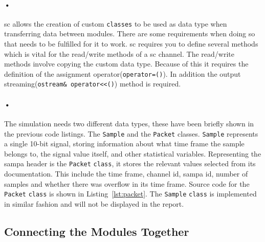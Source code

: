 \documentclass[a4paper, 12pt, openright, twoside]{report}
\newcommand{\codeword}[1]{\texttt{#1}}
\begin{document}
\paragraph{•}
\gls{sc} allows the creation of custom \codeword{classes} to be used as data type when transferring data between modules.
There are some requirements when doing so that needs to be fulfilled for it to work.
\gls{sc} requires you to define several methods which is vital for the read/write methods of a \gls{sc} channel.
The read/write methods involve copying the custom data type.
Because of this it requires the definition of the assignment operator(\codeword{operator=()}).
In addition the output streaming(\codeword{ostream\& operator<<()}) method is required. 

\paragraph{•}
The simulation needs two different data types, these have been briefly shown in the previous code listings.
The \codeword{Sample} and the \codeword{Packet} classes.
\codeword{Sample} represents a single 10-bit signal, storing information about what time frame the sample belongs to, the signal value itself, and other statistical variables.
Representing the \gls{sampa} header is the \codeword{Packet} \codeword{class}, it stores the relevant values selected from its documentation.
This include the time frame, channel id, sampa id, number of samples and whether there was overflow in its time frame.
Source code for the \codeword{Packet} \codeword{class} is shown in Listing~\ref{lst:packet}.
The \codeword{Sample} \codeword{class} is implemented in similar fashion and will not be displayed in the report. 

\begin{minipage}{\linewidth}

\end{minipage}

\subsection{Connecting the Modules Together}
\end{document}
